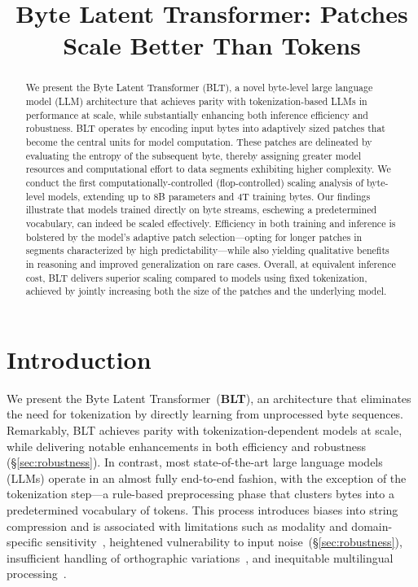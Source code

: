 \title{Byte Latent Transformer: Patches Scale Better Than Tokens}

\begin{abstract}
We present the Byte Latent Transformer ({\textsc BLT}), a novel byte-level large language model (LLM) architecture that achieves parity with tokenization-based LLMs in performance at scale, while substantially enhancing both inference efficiency and robustness. {\textsc BLT} operates by encoding input bytes into adaptively sized patches that become the central units for model computation. These patches are delineated by evaluating the entropy of the subsequent byte, thereby assigning greater model resources and computational effort to data segments exhibiting higher complexity. We conduct the first computationally-controlled (flop-controlled) scaling analysis of byte-level models, extending up to 8B parameters and 4T training bytes. Our findings illustrate that models trained directly on byte streams, eschewing a predetermined vocabulary, can indeed be scaled effectively. Efficiency in both training and inference is bolstered by the model's adaptive patch selection—opting for longer patches in segments characterized by high predictability—while also yielding qualitative benefits in reasoning and improved generalization on rare cases. Overall, at equivalent inference cost, {\textsc BLT} delivers superior scaling compared to models using fixed tokenization, achieved by jointly increasing both the size of the patches and the underlying model.
\end{abstract}

\section{Introduction}
\label{section:intro}

We present the Byte Latent Transformer~(\textbf{BLT}), an architecture that eliminates the need for tokenization by directly learning from unprocessed byte sequences. Remarkably, BLT achieves parity with tokenization-dependent models at scale, while delivering notable enhancements in both efficiency and robustness (\S\ref{sec:robustness}). In contrast, most state-of-the-art large language models (LLMs) operate in an almost fully end-to-end fashion, with the exception of the tokenization step—a rule-based preprocessing phase that clusters bytes into a predetermined vocabulary of tokens. This process introduces biases into string compression and is associated with limitations such as modality and domain-specific sensitivity~\citep{dagangetting}, heightened vulnerability to input noise~(\S\ref{sec:robustness}), insufficient handling of orthographic variations~\citep{edman2024cute}, and inequitable multilingual processing~\citep{liang2023xlm,petrov2024language,limisiewicz2024myte}.

